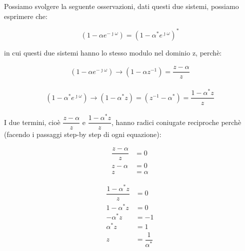 Possiamo svolgere la seguente osservazioni, dati questi due sistemi, possiamo esprimere che: 

{
    \Large 
    \begin{equation}
        \left(1 - \alpha e^{-\jmath \omega}\right)
        = 
        \left(1 - \alpha^{*} e^{\jmath \omega}\right)^{*}
    \end{equation}
}

in cui questi due sistemi hanno lo stesso modulo nel dominio z, perchè: 

{
    \Large 
    \begin{equation}
        \begin{split}
        \left(1 - \alpha e^{-\jmath \omega}\right)
        \to
        \left(1 - \alpha z^{-1}\right) 
        = 
        \dfrac{z - \alpha}{z} 
        \end{split}
    \end{equation}
}

{
    \Large 
    \begin{equation}
        \begin{split}
        \left(1 - \alpha^{*} e^{\jmath \omega}\right)
        \to
        \left(1 - \alpha^{*} z\right) 
        = 
        \left( z^{-1} - \alpha^{*} \right) 
        =
        \dfrac{1 - \alpha^{*} z}{z} 
        \end{split}
    \end{equation}
}

I due termini, cioè $\dfrac{z - \alpha}{z}$ e $\dfrac{1 - \alpha^{*} z}{z} $, hanno radici coniugate reciproche perchè (facendo i passaggi step-by step di ogni equazione): 

{
    \Large 
    \begin{equation}
        \begin{split}
        \dfrac{z - \alpha}{z} 
        &= 
        0
        \\
        z - \alpha &= 0
        \\
        z &= \alpha    
        \end{split}
    \end{equation}
}

{
    \Large 
    \begin{equation}
        \begin{split}
        \dfrac{1 - \alpha^{*} z}{z} 
        &= 
        0
        \\
        1 - \alpha^{*} z 
        &= 
        0
        \\
        - \alpha^{*} z 
        &= 
        -1 
        \\
        \alpha^{*} z 
        &= 
        1
        \\
        z 
        &= 
        \dfrac{1}{\alpha^{*}}            
        \end{split}
    \end{equation}
}

